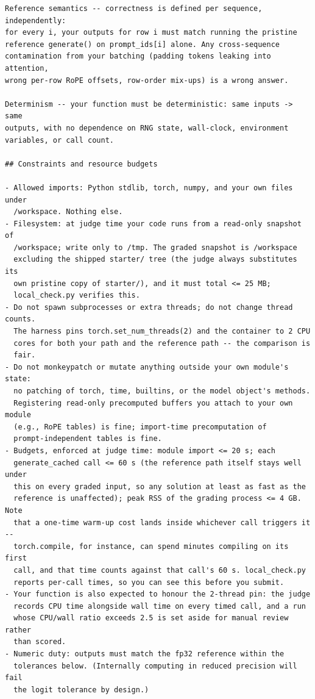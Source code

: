 \documentclass[11pt]{article}
\begin{document}
\begin{lstlisting}[style=plain]
Reference semantics -- correctness is defined per sequence, independently:
for every i, your outputs for row i must match running the pristine
reference generate() on prompt_ids[i] alone. Any cross-sequence
contamination from your batching (padding tokens leaking into attention,
wrong per-row RoPE offsets, row-order mix-ups) is a wrong answer.

Determinism -- your function must be deterministic: same inputs -> same
outputs, with no dependence on RNG state, wall-clock, environment
variables, or call count.

## Constraints and resource budgets

- Allowed imports: Python stdlib, torch, numpy, and your own files under
  /workspace. Nothing else.
- Filesystem: at judge time your code runs from a read-only snapshot of
  /workspace; write only to /tmp. The graded snapshot is /workspace
  excluding the shipped starter/ tree (the judge always substitutes its
  own pristine copy of starter/), and it must total <= 25 MB;
  local_check.py verifies this.
- Do not spawn subprocesses or extra threads; do not change thread counts.
  The harness pins torch.set_num_threads(2) and the container to 2 CPU
  cores for both your path and the reference path -- the comparison is
  fair.
- Do not monkeypatch or mutate anything outside your own module's state:
  no patching of torch, time, builtins, or the model object's methods.
  Registering read-only precomputed buffers you attach to your own module
  (e.g., RoPE tables) is fine; import-time precomputation of
  prompt-independent tables is fine.
- Budgets, enforced at judge time: module import <= 20 s; each
  generate_cached call <= 60 s (the reference path itself stays well under
  this on every graded input, so any solution at least as fast as the
  reference is unaffected); peak RSS of the grading process <= 4 GB. Note
  that a one-time warm-up cost lands inside whichever call triggers it --
  torch.compile, for instance, can spend minutes compiling on its first
  call, and that time counts against that call's 60 s. local_check.py
  reports per-call times, so you can see this before you submit.
- Your function is also expected to honour the 2-thread pin: the judge
  records CPU time alongside wall time on every timed call, and a run
  whose CPU/wall ratio exceeds 2.5 is set aside for manual review rather
  than scored.
- Numeric duty: outputs must match the fp32 reference within the
  tolerances below. (Internally computing in reduced precision will fail
  the logit tolerance by design.)


\end{lstlisting}
\end{document}
